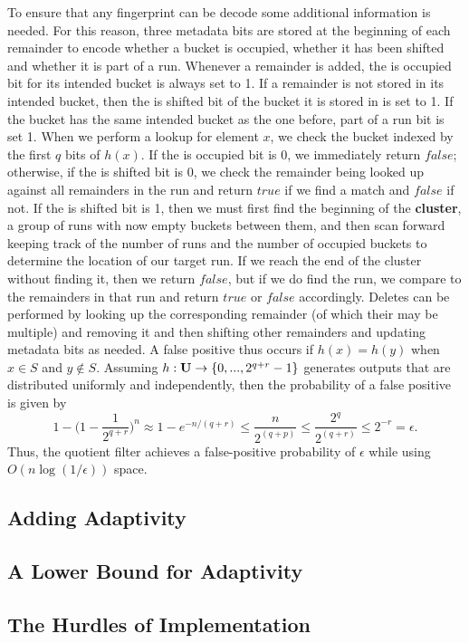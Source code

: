 \documentclass[../paper.tex]{subfiles}
\begin{document}
	To ensure that any fingerprint can be decode some additional information is needed.   For this reason, three metadata bits are stored at the beginning of each remainder to encode whether a bucket is occupied, whether it has been shifted and whether it is part of a run.  Whenever a remainder is added, the is occupied bit for its intended bucket is always set to 1.  If a remainder is not stored in its intended bucket, then the is shifted bit of the bucket it is stored in is set to 1.  If the bucket has the same intended bucket as the one before, part of a run bit is set 1.  When we perform a lookup for element $x$, we check the bucket indexed by the first $q$ bits of $h(x)$.  If the is occupied bit is 0, we immediately return $false$; otherwise, if the is shifted bit is 0, we check the remainder being looked up against all remainders in the run and return $true$ if we find a match and $false$ if not.  If the is shifted bit is 1, then we must first find the beginning of the {\bf cluster}, a group of runs with now empty buckets between them, and then scan forward keeping track of the number of runs and the number of occupied buckets to determine the location of our target run.  If we reach the end of the cluster without finding it, then we return $false$, but if we do find the run, we compare to the remainders in that run and return $true$ or $false$ accordingly.  Deletes can be performed by looking up the corresponding remainder (of which their may be multiple) and removing it and then shifting other remainders and updating metadata bits as needed.  A false positive thus occurs if $h(x) = h(y)$ when $x \in S$ and $y \notin S$.  Assuming $h: {\bf U} \rightarrow \{0, ... , 2^{q+r}-1\}$ generates outputs that are distributed uniformly and independently, then the probability of a false positive is given by 
	$$ 1 - \big(1 - \frac{1}{2^{q+r}}\big)^n \approx 1- e^{-n/(q+r)} \leq \frac{n}{2^{(q+p)}} \leq \frac{2^q}{2^{(q+r)}} \leq 2^{-r} = \epsilon .$$
Thus, the quotient filter achieves a false-positive probability of $\epsilon$ while using $O(n \log (1/\epsilon))$ space.  	

\subsection{Adding Adaptivity}
	

\subsection{A Lower Bound for Adaptivity}


\subsection{The Hurdles of Implementation}
\end{document}

